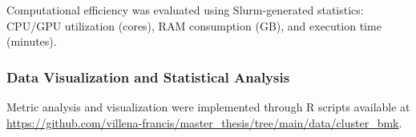 Computational efficiency was evaluated using Slurm-generated statistics: CPU/GPU 
utilization (cores), RAM consumption (GB), and execution time (minutes).

\subsubsection{Data Visualization and Statistical Analysis}

Metric analysis and visualization were implemented through R scripts available 
at \url{https://github.com/villena-francis/master_thesis/tree/main/data/cluster_bmk}.

















